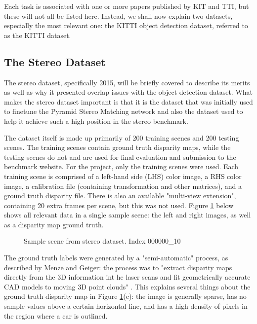 Each task is associated with one or more papers published by KIT and TTI, but these will not all be listed here. Instead, we shall now explain two datasets, especially the most relevant one: the KITTI object detection dataset, referred to as the KITTI dataset.

\subsection{The Stereo Dataset}
The stereo dataset, specifically 2015, will be briefly covered to describe its merits as well as why it presented overlap issues with the object detection dataset. What makes the stereo dataset important is that it is the dataset that was initially used to finetune the Pyramid Stereo Matching network and also the dataset used to help it achieve such a high position in the stereo benchmark. 

The dataset itself is made up primarily of 200 training scenes and 200 testing scenes. The training scenes contain ground truth disparity maps, while the testing scenes do not and are used for final evaluation and submission to the benchmark website. For the project, only the training scenes were used. Each training scene is comprised of a left-hand side (LHS) color image, a RHS color image, a calibration file (containing transformation and other matrices), and a ground truth disparity file. There is also an available "multi-view extension", containing 20 extra frames per scene, but this was not used. Figure \ref{stereo_sample} below shows all relevant data in a single sample scene: the left and right images, as well as a disparity map ground truth.

\begin{figure}[H]
    \centering
    \caption{Sample scene from stereo dataset. Index 000000\_10}
    \label{stereo_sample}
\end{figure}

The ground truth labels were generated by a "semi-automatic" process, as described by Menze and Geiger: the process was to "extract disparity maps directly from the 3D information int he laser scans and fit geometrically accurate CAD models to moving 3D point clouds" \cite{Menze_2015_CVPR}. This explains several things about the ground truth disparity map in Figure \ref{stereo_sample}(c): the image is generally sparse, has no sample values above a certain horizontal line, and has a high density of pixels in the region where a car is outlined.

